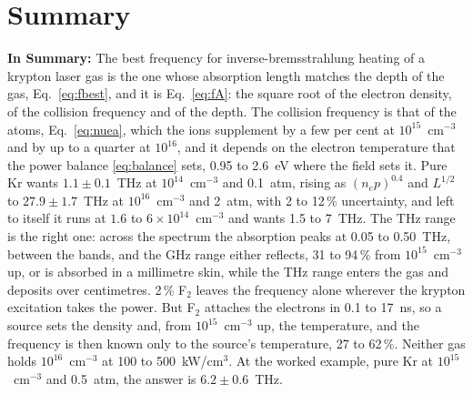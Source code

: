 \documentclass[11pt]{article}
\numberwithin{equation}{section}
\begin{document}
\section{Summary}
\label{sec:summary}
\noindent\textbf{In Summary:} The best frequency for inverse-bremsstrahlung heating of a
krypton laser gas is the one whose absorption length matches the depth of the gas,
Eq.~\eqref{eq:fbest}, and it is Eq.~\eqref{eq:fA}: the square root of the electron
density, of the collision frequency and of the depth. The collision frequency is that of
the atoms, Eq.~\eqref{eq:nuea}, which the ions supplement by a few per cent at
$10^{15}$~cm$^{-3}$ and by up to a quarter at $10^{16}$, and it depends on the electron
temperature that the power balance \eqref{eq:balance} sets, 0.95 to 2.6~eV where the
field sets it. Pure Kr wants $1.1\pm0.1$~THz at $10^{14}$~cm$^{-3}$ and 0.1~atm, rising as
$(n_ep)^{0.4}$ and $L^{1/2}$ to $27.9\pm1.7$~THz at $10^{16}$~cm$^{-3}$ and 2~atm, with 2 to
12\,\% uncertainty, and left to itself it runs at $1.6$ to $6\times10^{14}$~cm$^{-3}$ and
wants 1.5 to 7~THz. The THz range is the right one: across the spectrum the absorption
peaks at 0.05 to 0.50~THz, between the bands, and the GHz range either reflects, 31 to 94\,\%
from $10^{15}$~cm$^{-3}$ up, or is absorbed in a millimetre skin, while the THz range enters the
gas and deposits over centimetres. 2\,\% F$_2$ leaves the frequency alone wherever the
krypton excitation takes the power. But F$_2$ attaches the electrons in 0.1 to 17~ns, so a
source sets the density and, from $10^{15}$~cm$^{-3}$ up, the temperature, and the frequency
is then known only to the source's temperature, 27 to 62\,\%. Neither gas holds
$10^{16}$~cm$^{-3}$ at 100 to 500~kW/cm$^3$. At the worked example, pure Kr at
$10^{15}$~cm$^{-3}$ and 0.5~atm, the answer is $6.2\pm0.6$~THz.


\appendix
\end{document}
